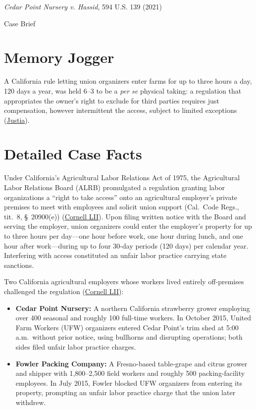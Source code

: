 \documentclass[12pt]{article}
\begin{document}
\begin{center}
{\LARGE \textit{Cedar Point Nursery v. Hassid}, 594 U.S. 139 (2021)\par}
\vspace{0.8em}
{\large Case Brief\par}
\end{center}
\vspace{1em}

\section{Memory Jogger}
A California rule letting union organizers enter farms for up to three hours a day, 120 days a year, was held 6--3 to be a \emph{per se} physical taking: a regulation that appropriates the owner's right to exclude for third parties requires just compensation, however intermittent the access, subject to limited exceptions (\href{https://supreme.justia.com/cases/federal/us/594/20-107/}{Justia}).

\section{Detailed Case Facts}
Under California's Agricultural Labor Relations Act of 1975, the Agricultural Labor Relations Board (ALRB) promulgated a regulation granting labor organizations a ``right to take access'' onto an agricultural employer's private premises to meet with employees and solicit union support (Cal.\ Code Regs., tit.~8, \S~20900(e)) (\href{https://www.law.cornell.edu/supremecourt/text/20-107}{Cornell LII}). Upon filing written notice with the Board and serving the employer, union organizers could enter the employer's property for up to three hours per day---one hour before work, one hour during lunch, and one hour after work---during up to four 30-day periods (120 days) per calendar year. Interfering with access constituted an unfair labor practice carrying state sanctions.

Two California agricultural employers whose workers lived entirely off-premises challenged the regulation (\href{https://www.law.cornell.edu/supremecourt/text/20-107}{Cornell LII}):
\begin{itemize}
    \item \textbf{Cedar Point Nursery:} A northern California strawberry grower employing over 400 seasonal and roughly 100 full-time workers. In October 2015, United Farm Workers (UFW) organizers entered Cedar Point's trim shed at 5:00 a.m.\ without prior notice, using bullhorns and disrupting operations; both sides filed unfair labor practice charges.
    \item \textbf{Fowler Packing Company:} A Fresno-based table-grape and citrus grower and shipper with 1,800--2,500 field workers and roughly 500 packing-facility employees. In July 2015, Fowler blocked UFW organizers from entering its property, prompting an unfair labor practice charge that the union later withdrew.
\end{itemize}
\end{document}

